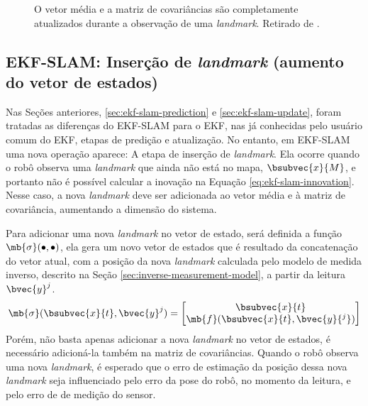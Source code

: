 \begin{figure}[h]
  \centering
  
  \caption{O vetor média e a matriz de covariâncias são completamente atualizados durante a observação de uma \textit{landmark}. Retirado de \cite[p.~8]{jsola}.}
  \label{fig:ekf-slam-update}
\end{figure}

\subsection{EKF-SLAM: Inserção de \textit{landmark} (aumento do vetor de estados)}
Nas Seções anteriores, \ref{sec:ekf-slam-prediction} e \ref{sec:ekf-slam-update}, foram tratadas as diferenças 
do EKF-SLAM para o EKF, nas já conhecidas pelo usuário comum do EKF, etapas de predição e atualização. No entanto, em EKF-SLAM uma nova operação aparece: A etapa de inserção de \textit{landmark}. Ela ocorre quando o robô observa uma \textit{landmark} que ainda não está no mapa, $\bsubvec{x}{M}$, e portanto não é possível calcular a inovação na Equação \ref{eq:ekf-slam-innovation}. Nesse caso, a nova \textit{landmark} deve ser adicionada ao vetor média e à matriz de covariância, aumentando a dimensão do sistema.

Para adicionar uma nova \textit{landmark} no vetor de estado, será definida 
a função $\mb{\sigma}(\bullet, \bullet)$, ela gera um novo vetor de estados 
que é resultado da concatenação do vetor atual, com a posição da nova 
\textit{landmark} calculada pelo modelo de medida inverso, descrito na Seção \ref{sec:inverse-measurement-model}, a partir da leitura $\bvec{y}^j$.
\begin{equation}
      \mb{\sigma}(\bsubvec{x}{t}, \bvec{y}^j) = \begin{bmatrix}
        \bsubvec{x}{t} \\
        \mb{f}(\bsubvec{x}{t}, \bvec{y}{^j})
      \end{bmatrix}
\end{equation}
Porém, não basta apenas adicionar a nova \textit{landmark} no vetor de estados, é necessário adicioná-la também na matriz de covariâncias. Quando 
o robô observa uma nova \textit{landmark}, é esperado que o erro de estimação 
da posição dessa nova \textit{landmark} seja influenciado pelo erro da 
pose do robô, no momento da leitura, e pelo erro de de medição do sensor. 

